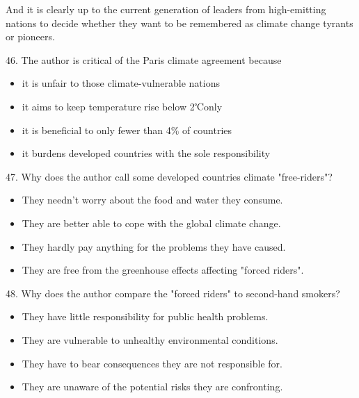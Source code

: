 \documentclass[UTF8,11pt]{ctexart}
\begin{document}
And it is clearly up to the current generation of leaders from high-emitting nations to decide whether they want to be remembered as climate change tyrants or pioneers.


46. The author is critical of the Paris climate agreement because


\begin{itemize}[leftmargin=2em,itemsep=.2em,topsep=.4em]\item[A.] it is unfair to those climate-vulnerable nations
\item[B.] it aims to keep temperature rise below 2℃only
\item[C.] it is beneficial to only fewer than 4\% of countries
\item[D.] it burdens developed countries with the sole responsibility
\end{itemize}

47. Why does the author call some developed countries climate "free-riders"?


\begin{itemize}[leftmargin=2em,itemsep=.2em,topsep=.4em]\item[A.] They needn't worry about the food and water they consume.
\end{itemize}

\begin{itemize}[leftmargin=2em,itemsep=.2em,topsep=.4em]\item[B.] They are better able to cope with the global climate change.
\item[C.] They hardly pay anything for the problems they have caused.
\item[D.] They are free from the greenhouse effects affecting "forced riders".
\end{itemize}

48. Why does the author compare the "forced riders" to second-hand smokers?


\begin{itemize}[leftmargin=2em,itemsep=.2em,topsep=.4em]\item[A.] They have little responsibility for public health problems.
\item[B.] They are vulnerable to unhealthy environmental conditions.
\item[C.] They have to bear consequences they are not responsible for.
\item[D.] They are unaware of the potential risks they are confronting.
\end{itemize}
\end{document}
